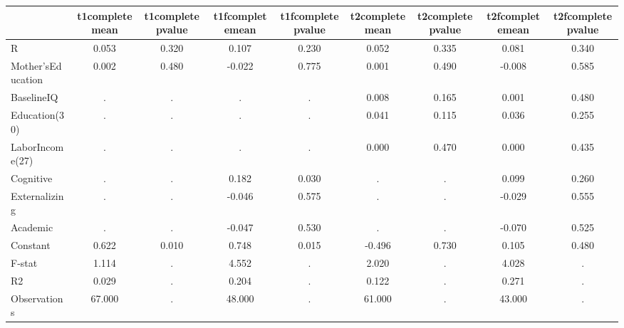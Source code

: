 \begin{table}[htbp]
\begin{tabular}{lcccccccc} \hline \hline
 & t1completemean  & t1completepvalue  & t1fcompletemean  & t1fcompletepvalue  & t2completemean  & t2completepvalue  & t2fcompletemean  & t2fcompletepvalue  \\  \hline 
R &     0.053 &     0.320 &     0.107 &     0.230 &     0.052 &     0.335 &     0.081 &     0.340 \\  
Mother'sEducation &     0.002 &     0.480 &    -0.022 &     0.775 &     0.001 &     0.490 &    -0.008 &     0.585 \\  
BaselineIQ &         . &         . &         . &         . &     0.008 &     0.165 &     0.001 &     0.480 \\  
Education(30) &         . &         . &         . &         . &     0.041 &     0.115 &     0.036 &     0.255 \\  
LaborIncome(27) &         . &         . &         . &         . &     0.000 &     0.470 &     0.000 &     0.435 \\  
Cognitive &         . &         . &     0.182 &     0.030 &         . &         . &     0.099 &     0.260 \\  
Externalizing &         . &         . &    -0.046 &     0.575 &         . &         . &    -0.029 &     0.555 \\  
Academic &         . &         . &    -0.047 &     0.530 &         . &         . &    -0.070 &     0.525 \\  
Constant &     0.622 &     0.010 &     0.748 &     0.015 &    -0.496 &     0.730 &     0.105 &     0.480 \\  
F-stat &     1.114 &         . &     4.552 &         . &     2.020 &         . &     4.028 &         . \\  
R2 &     0.029 &         . &     0.204 &         . &     0.122 &         . &     0.271 &         . \\  
Observations &    67.000 &         . &    48.000 &         . &    61.000 &         . &    43.000 &         . \\  
\hline \hline \end{tabular}
\end{table}
